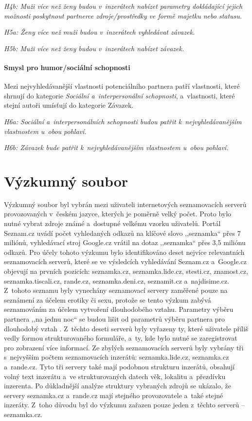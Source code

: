 \documentclass[a4paper, 12pt, notitlepage, oneside, numbers=noenddot]{report}
\begin{document}
\emph{H4b: Muži více než ženy budou v~inzerátech nabízet parametry
  dokládající jejich možnosti poskytnout partnerce zdroje/prostředky
  ve formě majetku nebo statusu.}

\emph{H5a: Ženy více než muži budou v~inzerátech vyhledávat závazek.}

\emph{H5b: Muži více než ženy budou v~inzerátech nabízet závazek.}

\paragraph{Smysl pro humor/sociální schopnosti}

Mezi nejvyhledávanější vlastnosti potenciál\-ního partnera patří
vlastnosti, které \citet{BarrettDunbarLycett2007} shrnují do kategorie
\emph{Sociální a~interpersonální schopnosti}, a~vlastnosti, které
stejní autoři umísťují do kategorie Závazek.

\emph{H6a: Sociální a~interpersonálních schopnosti budou patřit
  k~nejvyhledávanějším vlastnostem u~obou pohlaví.}

\emph{H6b: Závazek bude patřit k~nejvyhledávanějším vlastnostem u~obou
  pohlaví.}

\section{Výzkumný soubor}
Výzkumný soubor byl vybrán mezi uživateli internetových seznamovacích
serverů provozovaných v~českém jazyce, kterých je poměrně velký počet.
Proto bylo nutné vybrat zdroje známé a~dostupné velkému vzorku
uživatelů.  Portál Seznam.cz uvádí počet vyhledaných odkazů na klíčové
slovo ,,seznamka`` přes 7 miliónů, vy\-hle\-dávací stroj Google.cz
vrátil na dotaz ,,seznamka`` přes 3,5 miliónu odkazů.  Pro účely
tohoto výzkumu bylo identifikováno deset nejvíce relevantních
seznamovacích serverů, které se ve výsledcích vyhledávání Seznam.cz
a~Google.cz objevují na prvních pozicích: seznamka.cz,
seznamka.lide.cz, stesti.cz, znamost.cz, seznamka.tiscali.cz,
rande.cz, seznamka.deni.cz, seznamit.cz a~najdisime.cz.  Z~tohoto
seznamu byly vynechány seznamovací servery zaměřené pouze na seznámení
za účelem erotiky či sexu, protože se tento výzkum zabývá seznamováním
za účelem vytvoření dlouhodobého vztahu.  Parametry výběru partnera
,,na jednu noc`` se budou lišit od parametrů výběru partnera pro
dlouhodobý vztah \citep{Buss2007}.  Z~těchto deseti serverů byly
vyřazeny ty, které uživatele příliš vedly formou strukturovaného
formuláře, a~ty, kde bylo nutné se zaregistrovat pro zobrazení více
informací.  Ze zbylých seznamovacích serverů byly vybrány tři
s~nejvyšším počtem seznamovacích inzerátů: seznamka.lide.cz,
seznamka.cz a~rande.cz.  Tyto tři servery také mají podobnou strukturu
inzerátů, obsahují volný text inzerátu a~ve strukturovaných datech
věk, lokalitu a~přezdívku inzerenta.  Po důkladnější analýze struktury
vybraných zdrojů se ukázalo, že servery seznamka.cz a~rande.cz mají
stejného provozovatele a~také stejné inzeráty.  Z~toho důvodu byl do
výzkumu zařazen pouze jeden z~těchto serverů -- seznamka.cz.
\end{document}
